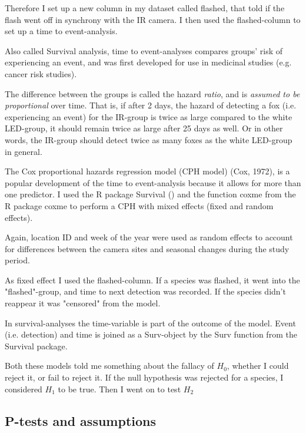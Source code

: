 Therefore I set up a new column in my dataset called flashed, that told if the flash went off in synchrony with the IR camera.
I then used the flashed-column to set up a time to event-analysis.

Also called Survival analysis, time to event-analyses compares groups' risk of experiencing an event, and was first developed for use in medicinal studies (e.g. cancer risk studies).

The difference between the groups is called the hazard \emph{ratio}, and is \emph{assumed to be proportional} over time. That is, if after 2 days, the hazard of detecting a fox (i.e. experiencing an event) for the IR-group is twice as large compared to the white LED-group, it should remain twice as large after 25 days as well. Or in other words, the IR-group should detect twice as many foxes as the white LED-group in general.


The Cox proportional hazards regression model (CPH model) (Cox, 1972), is a popular development of the time to event-analysis because it allows for more than one predictor. I used the R package Survival (\cite{survival-package}) and the function coxme from the R package coxme \cite{coxme-package} to perform a CPH with mixed effects (fixed and random effects). 

Again, location ID and week of the year were used as random effects to account for differences between the camera sites and seasonal changes during the study period.


As fixed effect I used the flashed-column.
If a species was flashed, it went into the "flashed"-group, and time to next detection was recorded. 
If the species didn't reappear it was "censored" from the model.


In survival-analyses the time-variable is part of the outcome of the model. Event (i.e. detection) and time is joined as a Surv-object by the Surv function from the Survival package. 


Both these models told me something about the fallacy of $H_0$, whether I could reject it, or fail to reject it.
If the null hypothesis was rejected for a species, I considered $H_1$ to be true. Then I went on to test $H_2$





	\subsection*{P-tests and assumptions}

